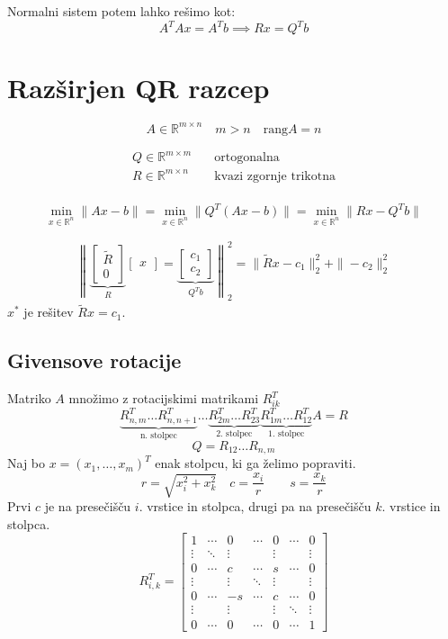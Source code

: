 \begin{multicols}{4}
Normalni sistem potem lahko rešimo kot:
\[ A^TAx = A^Tb \implies Rx = Q^Tb\]

\section{Razširjen QR razcep}
\[ A \in \mathbb{R}^{m\times n} \quad m > n \quad \text{rang}A = n \]

\begin{align*}
	Q \in \mathbb{R}^{m\times m} \quad &\text{ortogonalna } \\
	R \in \mathbb{R}^{m\times n} \quad &\text{kvazi zgornje trikotna} \\
\end{align*}

\[ \scriptstyle \min\limits_{x\in\mathbb{R}^n} \| Ax - b\| = \min\limits_{x\in\mathbb{R}^n} \| Q^T(Ax - b)\| = \min\limits_{x\in\mathbb{R}^n} \| Rx - Q^Tb \| \]

\begin{align*}	
	\left\| \underbrace{\begin{bmatrix}
		\tilde{R} \\ 0
	\end{bmatrix}}_{R}
	\begin{bmatrix}
		x
	\end{bmatrix}
	=
	\underbrace{\begin{bmatrix}
		c_1 \\
		c_2
	\end{bmatrix}}_{Q^T b}
	\right\|^2_2
	= \| \tilde{R}x - c_1 \|^2_2 + \|-c_2\|^2_2
\end{align*}
$x^*$ je rešitev $\tilde{R}x = c_1$.

\subsection{Givensove rotacije}
Matriko $A$ množimo z rotacijskimi matrikami $R_{ik}^T$
\[ \underbrace{R_{n,m}^T \dots  R_{n,n+1}^T}_{\text{n. stolpec}} \dots \underbrace{R_{2m}^T \dots R_{23}^T}_{\text{2. stolpec}} \underbrace{R_{1m}^T \dots R_{12}^T}_{\text{1. stolpec}} A = R\]
\[ Q = R_{12} \dots R_{n,m}\]
Naj bo $x = (x_1, \dots, x_m)^T$ enak stolpcu, ki ga želimo popraviti.
\[ r = \sqrt{x_i^2 + x_k^2} \quad c = \frac{x_i}{r} \qquad s = \frac{x_k}{r}\]
Prvi $c$ je na presečišču $i$. vrstice in stolpca, drugi pa na presečišču $k$. vrstice in stolpca.
\[R_{i,k}^T = \begin{bmatrix}   1   & \cdots &    0   & \cdots &    0   & \cdots &    0   \\
	\vdots & \ddots & \vdots &        & \vdots &        & \vdots \\
	   0   & \cdots &    c   & \cdots &   s   & \cdots &    0   \\
	\vdots &        & \vdots & \ddots & \vdots &        & \vdots \\
	   0   & \cdots &    -s   & \cdots &    c   & \cdots &    0   \\
	\vdots &        & \vdots &        & \vdots & \ddots & \vdots \\
	   0   & \cdots &    0   & \cdots &    0   & \cdots &    1
\end{bmatrix}\]


\end{multicols}
